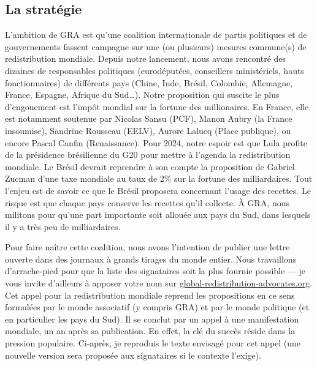 \documentclass[a5paper,french,openany]{memoir}
\begin{document}
\subsection{La stratégie}

L'ambition de GRA est qu'une coalition internationale de partis politiques et de gouvernements fassent campagne sur une (ou plusieurs) mesures commune(s) de redistribution mondiale. Depuis notre lancement, nous avons rencontré des dizaines de responsables politiques (eurodéputé\textperiodcentered{}e\textperiodcentered{}s, conseillers ministériels, hauts fonctionnaires) de différents pays (Chine, Inde, Brésil, Colombie, Allemagne, France, Espagne, Afrique du Sud\dots). Notre proposition qui suscite le plus d'engouement est l'impôt mondial sur la fortune des millionaires. En France, elle est notamment soutenue par Nicolas Sansu (PCF), Manon Aubry (la France insoumise), Sandrine Rousseau (EELV), Aurore Lalucq (Place publique), ou encore Pascal Canfin (Renaissance). %
Pour 2024, notre espoir est que Lula profite de la présidence brésilienne du G20 pour mettre à l'agenda la redistribution mondiale. Le Brésil devrait reprendre à son compte la proposition de Gabriel Zucman d'une taxe mondiale au taux de 2\% sur la fortune des milliardaires. Tout l'enjeu est de savoir ce que le Brésil proposera concernant l'usage des recettes. Le risque est que chaque pays conserve les recettes qu'il collecte. À GRA, nous militons pour qu'une part importante soit allouée aux pays du Sud, dans lesquels il y a très peu de milliardaires.

Pour faire naître cette coalition, nous avons l'intention de publier une lettre ouverte dans des journaux à grands tirages du monde entier. Nous travaillons d'arrache-pied pour que la liste des signataires soit la plus fournie possible --- je vous invite d'ailleurs à apposer votre nom sur \href{https://global-redistribution-advocates.org/fr/signer-les-petitions}{global-redistribution-advocates.org}. Cet appel pour la redistribution mondiale reprend les propositions en ce sens formulées par le monde  associatif (y compris GRA) et par le monde politique (et en particulier les pays du Sud). Il se conclut par un appel à une manifestation mondiale, un an après sa publication. En effet, la clé du succès réside dans la pression populaire. Ci-après, je reproduis le texte envisagé pour cet appel (une nouvelle version sera proposée aux signataires si le contexte l'exige).%
\end{document}
